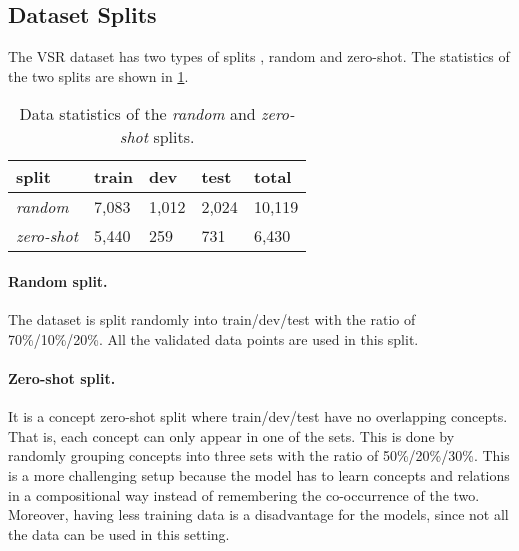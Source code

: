 \subsection{Dataset Splits}\label{sec:vsr_splits}

The VSR dataset has two types of splits \cite{liu2022visual}, random and zero-shot. The statistics of the two splits are shown in \cref{tab:data_splits}.

\begin{table}[ht]
\small
\centering
\begin{tabular}{lllll}
\toprule
 split & train & dev & test & total   \\
\midrule
\textit{random} & 7,083 & 1,012 & 2,024 & 10,119 \\
\textit{zero-shot} & 5,440 & 259 & 731  & 6,430\\
\bottomrule
\end{tabular}
\caption{Data statistics of the \textit{random} and \textit{zero-shot} splits. }
\label{tab:data_splits}
\end{table}

\paragraph{Random split.}
The dataset is split randomly into train/dev/test with the ratio of 70\%/10\%/20\%. All the validated data points are used in this split.

\paragraph{Zero-shot split.}
It is a concept zero-shot split where train/dev/test have no overlapping concepts. That is, each concept can only appear in one of the sets.
This is done by randomly grouping concepts into three sets with the ratio of 50\%/20\%/30\%.
This is a more challenging setup because the model has to learn concepts and relations in a compositional way instead of remembering the co-occurrence of the two.
Moreover, having less training data is a disadvantage for the models, since not all the data can be used in this setting.